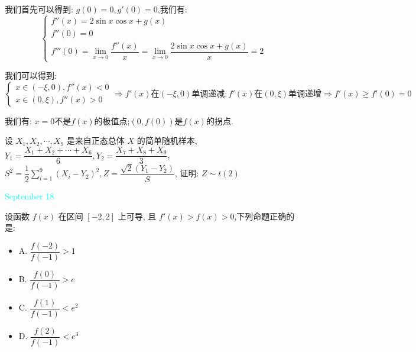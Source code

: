 \begin{solution}

	我们首先可以得到:  $g(0)=0,g'(0)=0$,我们有:  
	$$\left\lbrace
	\begin{array}{l}
		f''(x)=2\sin x\cos x+g(x)\\
		f''(0)=0\\
		f'''(0)=\lim\limits_{x\to 0}\dfrac{f''(x)}{x}=\lim\limits_{x\to 0}\dfrac{2\sin x\cos x+g(x)}{x}=2
	\end{array}
	\right. $$
	
	我们可以得到:  $$\left\lbrace
	\begin{array}{l}
		x\in(-\xi,0),f''(x)<0\\
		x\in(0,\xi),f''(x)>0
	\end{array}
	\right. \Rightarrow f'(x)\text{在}(-\xi,0)\text{单调递减};f'(x)\text{在}(0,\xi)\text{单调递增}\Rightarrow f'(x)\geq f'(0)=0$$
	
	我们有:  $x=0$不是$f(x)$的极值点;$(0,f(0))$是$f(x)$的拐点.
\end{solution}

\begin{example}[][Exam: 35.3.6]
	设 $X_{1},X_{2},\cdots,X_{9}$ 是来自正态总体 $X$ 的简单随机样本,$Y_{1}=\dfrac{X_{1}+X_{2}+\cdots+X_{6}}{6}, Y_{2}=\dfrac{X_{7}+X_{8}+X_{9}}{3}$,
	$S^2=\dfrac{1}{2}\sum\limits_{i=1}^{9}(X_{i}-Y_{2})^2, Z=\dfrac{\sqrt{2}(Y_{1}-Y_{2})}{S}$, 证明: $Z\sim t(2)$
\end{example}
\begin{solution}
	
\end{solution}


\textcolor{cyan}{September 18}

\begin{example}[][Exam: 35.3.7]
	设函数 $f(x)$ 在区间 $[-2,2]$ 上可导, 且 $f'(x)>f(x)>0$,下列命题正确的是:  
\begin{itemize}
	\item A. $\dfrac{f(-2)}{f(-1)}>1$
	\item B. $\dfrac{f(0)}{f(-1)}>e$
	\item C. $\dfrac{f(1)}{f(-1)}<e^2$
	\item D. $\dfrac{f(2)}{f(-1)}<e^3$
\end{itemize}
\end{example}

